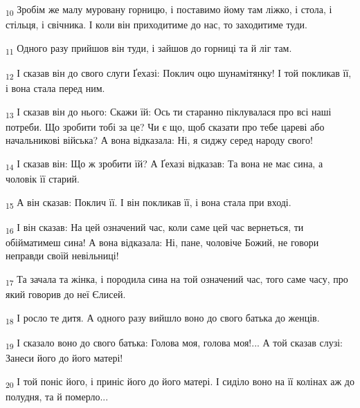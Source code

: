 \begin{tcolorbox}
\textsubscript{10} Зробім же малу муровану горницю, і поставимо йому там ліжко, і стола, і стільця, і свічника. І коли він приходитиме до нас, то заходитиме туди.
\end{tcolorbox}
\begin{tcolorbox}
\textsubscript{11} Одного разу прийшов він туди, і зайшов до горниці та й ліг там.
\end{tcolorbox}
\begin{tcolorbox}
\textsubscript{12} І сказав він до свого слуги Ґехазі: Поклич оцю шунамітянку! І той покликав її, і вона стала перед ним.
\end{tcolorbox}
\begin{tcolorbox}
\textsubscript{13} І сказав він до нього: Скажи їй: Ось ти старанно піклувалася про всі наші потреби. Що зробити тобі за це? Чи є що, щоб сказати про тебе цареві або начальникові війська? А вона відказала: Ні, я сиджу серед народу свого!
\end{tcolorbox}
\begin{tcolorbox}
\textsubscript{14} І сказав він: Що ж зробити їй? А Ґехазі відказав: Та вона не має сина, а чоловік її старий.
\end{tcolorbox}
\begin{tcolorbox}
\textsubscript{15} А він сказав: Поклич її. І він покликав її, і вона стала при вході.
\end{tcolorbox}
\begin{tcolorbox}
\textsubscript{16} І він сказав: На цей означений час, коли саме цей час вернеться, ти обійматимеш сина! А вона відказала: Ні, пане, чоловіче Божий, не говори неправди своїй невільниці!
\end{tcolorbox}
\begin{tcolorbox}
\textsubscript{17} Та зачала та жінка, і породила сина на той означений час, того саме часу, про який говорив до неї Єлисей.
\end{tcolorbox}
\begin{tcolorbox}
\textsubscript{18} І росло те дитя. А одного разу вийшло воно до свого батька до женців.
\end{tcolorbox}
\begin{tcolorbox}
\textsubscript{19} І сказало воно до свого батька: Голова моя, голова моя!... А той сказав слузі: Занеси його до його матері!
\end{tcolorbox}
\begin{tcolorbox}
\textsubscript{20} І той поніс його, і приніс його до його матері. І сиділо воно на її колінах аж до полудня, та й померло...
\end{tcolorbox}
